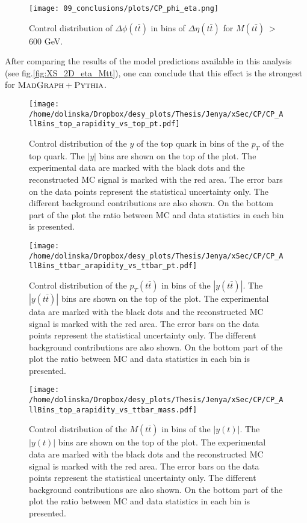 \begin{figure}[t]
  \centering
  \texttt{[image: 09\_conclusions/plots/CP\_phi\_eta.png]}
  \caption{Control distribution of $\Delta\phi({t\bar{t}})$ in bins of $\Delta\eta(t\bar{t})$ for $M(t\bar{t})\: >$ 600 GeV.}
  \label{fig:CP_phi_eta}
\end{figure}

After comparing the results of the model predictions available in this analysis (see fig.\ref{fig:XS_2D_eta_Mtt}), one can conclude that this effect is the
strongest for $\textsc{MadGraph}+\textsc{Pythia}$.



\begin{figure}[p]
  \centering
  \texttt{[image: /home/dolinska/Dropbox/desy\_plots/Thesis/Jenya/xSec/CP/CP\_AllBins\_top\_arapidity\_vs\_top\_pt.pdf]}
  \caption{Control distribution of the $y$ of the top quark in bins of the $p_{T}$ of the top quark. The $|y|$ bins are shown on the top 
  of the plot. The experimental data are marked with the black dots and the reconstructed MC signal is marked with the red area. The error
  bars on the data points represent the statistical uncertainty only. The 
  different background contributions are also shown. On the bottom part of the plot the ratio between MC and data statistics in each bin
  is presented.}
  \label{fig:CP_2D_y_pt}
\end{figure}

\begin{figure}[p]
  \centering
  \texttt{[image: /home/dolinska/Dropbox/desy\_plots/Thesis/Jenya/xSec/CP/CP\_AllBins\_ttbar\_arapidity\_vs\_ttbar\_pt.pdf]}
  \caption{Control distribution of the $p_{T}(t\bar{t})$ in bins of the $|y(t\bar{t})|$. The $|y(t\bar{t})|$ bins are shown on the top 
  of the plot. The experimental data are marked with the black dots and the reconstructed MC signal is marked with the red area. The error
  bars on the data points represent the statistical uncertainty only. The 
  different background contributions are also shown. On the bottom part of the plot the ratio between MC and data statistics in each bin
  is presented.}
  \label{fig:CP_2D_pttt_ytt}
\end{figure}

\begin{figure}[p]
  \centering
  \texttt{[image: /home/dolinska/Dropbox/desy\_plots/Thesis/Jenya/xSec/CP/CP\_AllBins\_top\_arapidity\_vs\_ttbar\_mass.pdf]}
  \caption{Control distribution of the $M(t\bar{t})$ in bins of the $|y(t)|$. The $|y(t)|$ bins are shown on the top 
  of the plot. The experimental data are marked with the black dots and the reconstructed MC signal is marked with the red area. The error
  bars on the data points represent the statistical uncertainty only. The 
  different background contributions are also shown. On the bottom part of the plot the ratio between MC and data statistics in each bin
  is presented.}
  \label{fig:CP_2D_Mtt_y}
\end{figure}

